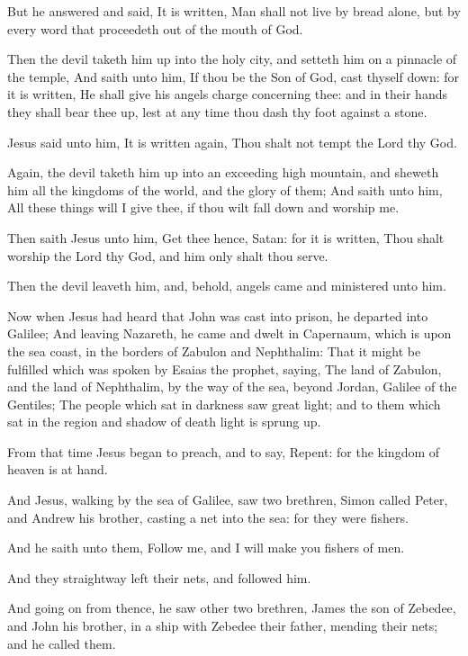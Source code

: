 \verse But he answered and said, It is written, Man shall not live by bread alone, but by every word that proceedeth out of the mouth of God.

\verse Then the devil taketh him up into the holy city, and setteth him on a pinnacle of the temple, \verse And saith unto him, If thou be the Son of God, cast thyself down: for it is written, He shall give his angels charge concerning thee: and in their hands they shall bear thee up, lest at any time thou dash thy foot against a stone.

\verse Jesus said unto him, It is written again, Thou shalt not tempt the Lord thy God.

\verse Again, the devil taketh him up into an exceeding high mountain, and sheweth him all the kingdoms of the world, and the glory of them; \verse And saith unto him, All these things will I give thee, if thou wilt fall down and worship me.

\verse Then saith Jesus unto him, Get thee hence, Satan: for it is written, Thou shalt worship the Lord thy God, and him only shalt thou serve.

\verse Then the devil leaveth him, and, behold, angels came and ministered unto him.

\verse Now when Jesus had heard that John was cast into prison, he departed into Galilee; \verse And leaving Nazareth, he came and dwelt in Capernaum, which is upon the sea coast, in the borders of Zabulon and Nephthalim: \verse That it might be fulfilled which was spoken by Esaias the prophet, saying, \verse The land of Zabulon, and the land of Nephthalim, by the way of the sea, beyond Jordan, Galilee of the Gentiles; \verse The people which sat in darkness saw great light; and to them which sat in the region and shadow of death light is sprung up.

\verse From that time Jesus began to preach, and to say, Repent: for the kingdom of heaven is at hand.

\verse And Jesus, walking by the sea of Galilee, saw two brethren, Simon called Peter, and Andrew his brother, casting a net into the sea: for they were fishers.

\verse And he saith unto them, Follow me, and I will make you fishers of men.

\verse And they straightway left their nets, and followed him.

\verse And going on from thence, he saw other two brethren, James the son of Zebedee, and John his brother, in a ship with Zebedee their father, mending their nets; and he called them.

